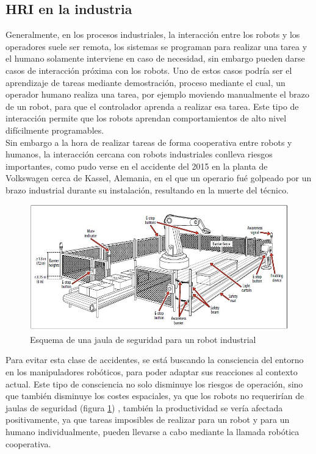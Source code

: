  \subsection{HRI en la industria}
 
 Generalmente, en los procesos industriales, la interacción entre los robots y los operadores suele ser remota, los sistemas se programan para realizar una tarea y el humano solamente interviene en caso de necesidad, sin embargo pueden darse casos de interacción próxima con los robots. Uno de estos casos podría ser el aprendizaje de tareas mediante demostración, proceso mediante el cual, un operador humano realiza una tarea, por ejemplo moviendo manualmente el brazo de un robot, para que el controlador aprenda a realizar esa tarea. Este tipo de interacción permite que los robots aprendan comportamientos de alto nivel difícilmente programables.\\
 Sin embargo a la hora de realizar tareas de forma cooperativa entre robots y humanos, la interacción cercana con robots industriales conlleva riesgos importantes, como pudo verse en el accidente del 2015\cite{vwaccident2015} en la planta de Volkswagen cerca de Kassel, Alemania, en el que un operario fué golpeado por un brazo industrial  durante su instalación, resultando en la muerte del técnico.
  \begin{figure}
	\centering
	\includegraphics[width=1\linewidth]{imagenes/robotcell.jpeg}
	\caption{Esquema de una jaula de seguridad para un robot industrial}
	\label{fig:robot-cell}
\end{figure} 
 Para evitar esta clase de accidentes, se está buscando la consciencia del entorno en los manipuladores robóticos, para poder adaptar sus reacciones al contexto actual. Este tipo de consciencia no solo disminuye los riesgos de operación, sino que también disminuye los costes espaciales, ya que los robots no requerirían de jaulas de seguridad (figura \ref{fig:robot-cell}) , también la productividad se vería afectada positivamente, ya que tareas imposibles de realizar para un robot y para un humano individualmente, pueden llevarse a cabo mediante la llamada robótica cooperativa.
